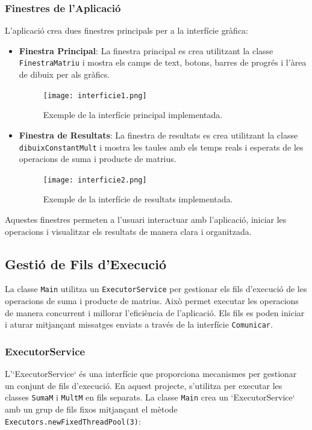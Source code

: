 \documentclass{ieeetj}
\begin{document}
\subsubsection{Finestres de l'Aplicació}
L'aplicació crea dues finestres principals per a la interfície gràfica:

\begin{itemize}
    \item \textbf{Finestra Principal}: La finestra principal es crea utilitzant la classe \texttt{FinestraMatriu} i mostra els camps de text, botons, barres de progrés i l'àrea de dibuix per als gràfics.

\begin{figure}[htbp]
\centerline{\texttt{[image: interficie1.png]}}
\caption{Exemple de la interfície principal implementada.}
\label{fig:int1}
\end{figure}

    \item \textbf{Finestra de Resultats}: La finestra de resultats es crea utilitzant la classe \texttt{dibuixConstantMult} i mostra les taules amb els temps reals i esperats de les operacions de suma i producte de matrius.

\begin{figure}[htbp]
\centerline{\texttt{[image: interficie2.png]}}
\caption{Exemple de la interfície de resultats implementada.}
\label{fig:int2}
\end{figure}

\end{itemize}

Aquestes finestres permeten a l'usuari interactuar amb l'aplicació, iniciar les operacions i visualitzar els resultats de manera clara i organitzada.


\subsection{Gestió de Fils d'Execució}
La classe \texttt{Main} utilitza un \texttt{ExecutorService} per gestionar els fils d'execució de les operacions de suma i producte de matrius. Això permet executar les operacions de manera concurrent i millorar l'eficiència de l'aplicació. Els fils es poden iniciar i aturar mitjançant missatges enviats a través de la interfície \texttt{Comunicar}.

\subsubsection{ExecutorService}
L'`ExecutorService` és una interfície que proporciona mecanismes per gestionar un conjunt de fils d'execució. En aquest projecte, s'utilitza per executar les classes \texttt{SumaM} i \texttt{MultM} en fils separats. La classe \texttt{Main} crea un `ExecutorService` amb un grup de fils fixos mitjançant el mètode \texttt{Executors.newFixedThreadPool(3)}:
\end{document}
